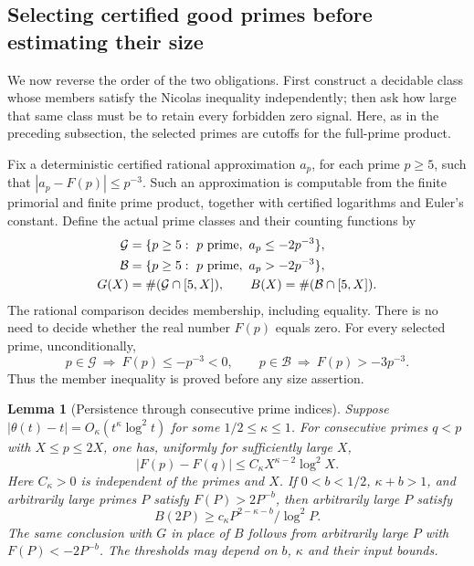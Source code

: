 \documentclass[11pt]{article}
\newtheorem{lemma}[theorem]{Lemma}
\theoremstyle{definition}
\begin{document}
\subsection{Selecting certified good primes before estimating their size}
\label{sec:certified-good-prime-class}

We now reverse the order of the two obligations.
First construct a decidable class whose members satisfy the
Nicolas inequality independently; then ask how large that
same class must be to retain every forbidden zero signal.
Here, as in the preceding subsection, the selected primes
are cutoffs for the full-prime product.

Fix a deterministic certified rational approximation $a_p$,
for each prime $p\ge5$, such that
$|a_p-F(p)|\le p^{-3}$. Such an approximation is computable
from the finite primorial and finite prime product, together
with certified logarithms and Euler's constant.
Define the actual prime classes and their counting functions by
\begin{equation}
 \begin{aligned}
 \mathcal G&=\{p\ge5:\ p\ {\rm prime},\ a_p\le-2p^{-3}\},\\
 \mathcal B&=\{p\ge5:\ p\ {\rm prime},\ a_p>-2p^{-3}\},\\
 G(X)&=\#(\mathcal G\cap[5,X]),\qquad
 B(X)=\#(\mathcal B\cap[5,X]).
 \end{aligned}
 \label{eq:certified-good-prime-definition}
\end{equation}
The rational comparison decides membership, including equality.
There is no need to decide whether the real number $F(p)$
equals zero. For every selected prime, unconditionally,
\begin{equation}
 p\in\mathcal G\ \Longrightarrow\ F(p)\le-p^{-3}<0,
 \qquad
 p\in\mathcal B\ \Longrightarrow\ F(p)>-3p^{-3}.
 \label{eq:certified-good-prime-inequality}
\end{equation}
Thus the member inequality is proved before any size assertion.

\begin{lemma}[Persistence through consecutive prime indices]
\label{lem:prime-index-persistence}
Suppose $|\theta(t)-t|=O_\kappa(t^\kappa\log^2t)$
for some $1/2\le\kappa\le1$. For consecutive primes $q<p$
with $X\le p\le2X$, one has, uniformly for sufficiently large $X$,
\begin{equation}
                    |F(p)-F(q)|
              \le C_\kappa X^{\kappa-2}\log^2X .
 \label{eq:prime-index-jump-bound}
\end{equation}
Here $C_\kappa>0$ is independent of the primes and $X$.
If $0<b<1/2$, $\kappa+b>1$, and arbitrarily large primes $P$
satisfy $F(P)>2P^{-b}$, then arbitrarily large $P$ satisfy
\begin{equation}
 B(2P)\ge c_\kappa P^{2-\kappa-b}/\log^2P.
 \label{eq:prime-index-bad-count}
\end{equation}
The same conclusion with $G$ in place of $B$ follows from
arbitrarily large $P$ with $F(P)<-2P^{-b}$.
The thresholds may depend on $b$, $\kappa$ and their input bounds.
\end{lemma}
\end{document}
